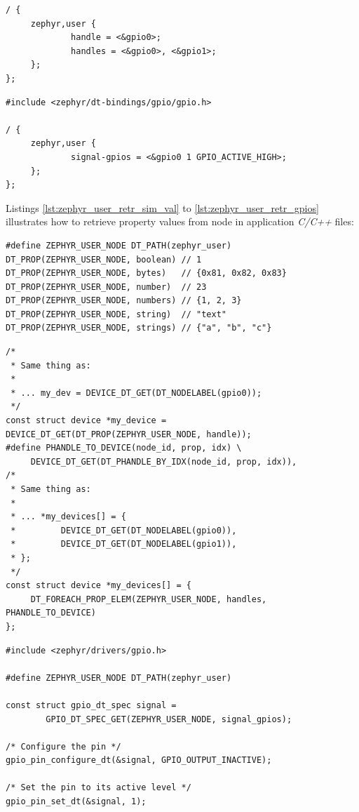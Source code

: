 \documentclass[report.tex]{subfiles}
\begin{document}
\begin{lstlisting}[style=C,label={lst:zephyr_user_dev},caption={Example \textit{zephyr,user} Node - Devices Properties}]
/ {
     zephyr,user {
             handle = <&gpio0>;
             handles = <&gpio0>, <&gpio1>;
     };
};
\end{lstlisting}

\begin{lstlisting}[style=C,label={lst:zephyr_user_gpios},caption={Example \textit{zephyr,user} Node - \textit{GPIOs} Properties - Source:\cite{dt_zephyr_user}}]
#include <zephyr/dt-bindings/gpio/gpio.h>

/ {
     zephyr,user {
             signal-gpios = <&gpio0 1 GPIO_ACTIVE_HIGH>;
     };
};
\end{lstlisting}

Listings \ref{lst:zephyr_user_retr_sim_val} to \ref{lst:zephyr_user_retr_gpios} illustrates how to retrieve property values from  node in application \textit{C/C++} files:

\begin{lstlisting}[style=C,label={lst:zephyr_user_retr_sim_val},caption={Example \textit{zephyr,user} Node - \textit{GPIOs} Properties - Source:\cite{dt_zephyr_user}}]
#define ZEPHYR_USER_NODE DT_PATH(zephyr_user)
DT_PROP(ZEPHYR_USER_NODE, boolean) // 1
DT_PROP(ZEPHYR_USER_NODE, bytes)   // {0x81, 0x82, 0x83}
DT_PROP(ZEPHYR_USER_NODE, number)  // 23
DT_PROP(ZEPHYR_USER_NODE, numbers) // {1, 2, 3}
DT_PROP(ZEPHYR_USER_NODE, string)  // "text"
DT_PROP(ZEPHYR_USER_NODE, strings) // {"a", "b", "c"}
\end{lstlisting}

\begin{lstlisting}[style=C,label={lst:zephyr_user_retr_dev},caption={Example \textit{zephyr,user} Node - \textit{GPIOs} Properties - Source:\cite{dt_zephyr_user}}]
/*
 * Same thing as:
 *
 * ... my_dev = DEVICE_DT_GET(DT_NODELABEL(gpio0));
 */
const struct device *my_device =  DEVICE_DT_GET(DT_PROP(ZEPHYR_USER_NODE, handle));
#define PHANDLE_TO_DEVICE(node_id, prop, idx) \
     DEVICE_DT_GET(DT_PHANDLE_BY_IDX(node_id, prop, idx)),
/*
 * Same thing as:
 *
 * ... *my_devices[] = {
 *         DEVICE_DT_GET(DT_NODELABEL(gpio0)),
 *         DEVICE_DT_GET(DT_NODELABEL(gpio1)),
 * };
 */
const struct device *my_devices[] = {
     DT_FOREACH_PROP_ELEM(ZEPHYR_USER_NODE, handles, PHANDLE_TO_DEVICE)
};
\end{lstlisting}

\begin{lstlisting}[style=C,label={lst:zephyr_user_retr_gpios},caption={Example \textit{zephyr,user} Node - \textit{GPIOs} Properties - Source:\cite{dt_zephyr_user}}]
#include <zephyr/drivers/gpio.h>

#define ZEPHYR_USER_NODE DT_PATH(zephyr_user)

const struct gpio_dt_spec signal =
        GPIO_DT_SPEC_GET(ZEPHYR_USER_NODE, signal_gpios);

/* Configure the pin */
gpio_pin_configure_dt(&signal, GPIO_OUTPUT_INACTIVE);

/* Set the pin to its active level */
gpio_pin_set_dt(&signal, 1);
\end{lstlisting}
\;\\[-50pt]
\end{document}
